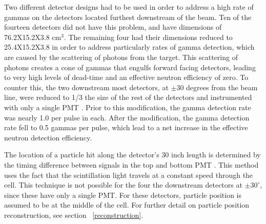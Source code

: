 Two different detector designs had to be used in order to address a high rate of gammas on the detectors located furthest downstream of the beam.
Ten of the fourteen detectors did not have this problem, and have dimensions of 76.2X15.2X3.8 cm$^3$.
The remaining four had their dimensions reduced to 25.4X15.2X3.8 in order to address particularly rates of gamma detection, which are caused by the scattering of photons from the target.
This scattering of photons creates a cone of gammas that engulfs forward facing detectors, leading to very high levels of dead-time and an effective neutron efficiency of zero.
To counter this, the two downstream most detectors, at $\pm$30 degrees from the beam line, were reduced to 1/3 the size of the rest of the detectors and instrumented with only a single PMT .
Prior to this modification, the gamma detection rate was nearly 1.0 per pulse in each.
After the modification, the gamma detection rate fell to 0.5 gammas per pulse, which lead to a net increase in the effective neutron detection efficiency.

The location of a particle hit along the detector's 30 inch length is determined by the timing difference between signals in the top and bottom PMT .
This method uses the fact that the scintillation light travels at a constant speed through the cell.
This technique is not possible for the four the downstream detectors at $\pm 30^{\circ}$, since these have only a single PMT.
For these detectors, particle position is assumed to be at the middle of the cell.
For further detail on particle position reconstruction, see section ~\ref{reconstruction}.

